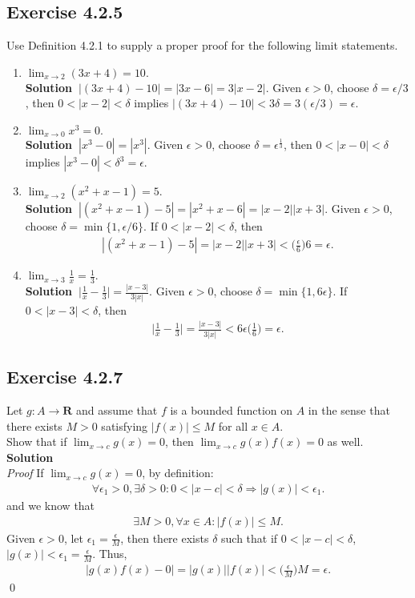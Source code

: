\documentclass[12pt]{report}
\newcommand{\sol}{{\textbf{Solution~}}}
\begin{document}
\subsection*{Exercise 4.2.5}
Use Definition 4.2.1 to supply a proper proof for the following
limit statements.
\begin{enumerate}[label=(\alph*)]
    \item $\lim_{x\to2}(3x+4)=10.$\\
    \sol $|(3x+4)-10|=|3x-6|=3|x-2|$. Given $\epsilon >0$, choose $\delta = \epsilon/3$, 
    then $0<|x-2|<\delta$ implies $|(3x+4)-10|<3\delta=3(\epsilon/3)=\epsilon$.
    \item $\lim_{x\to0}x^3=0.$\\
    \sol $|x^3-0|=|x^3|$. Given $\epsilon >0$, choose $\delta = \epsilon^{\frac{1}{3}}$, 
    then $0<|x-0|<\delta$ implies $|x^3-0|<\delta^3=\epsilon$.
    \item $\lim_{x\to2}(x^2+x-1)=5.$\\
    \sol $|(x^2+x-1)-5|=|x^2+x-6|=|x-2||x+3|$. Given $\epsilon >0$, choose $\delta = \min \{1,\epsilon/6\}$. 
    If $0<|x-2|<\delta$, then 
    \begin{align*}
        |(x^2+x-1)-5|=|x-2||x+3|<\bigg(\frac{\epsilon}{6}\bigg)6=\epsilon.
    \end{align*}
    \item $\lim_{x\to3}\frac{1}{x}=\frac{1}{3}.$\\
    \sol $\bigg|\frac{1}{x}-\frac{1}{3}\bigg|=\frac{|x-3|}{3|x|}$. Given $\epsilon >0$, 
    choose $\delta=\min\{1,6\epsilon\}$. If $0<|x-3|<\delta$, then
    \begin{align*}
        \bigg|\frac{1}{x}-\frac{1}{3}\bigg|=\frac{|x-3|}{3|x|}<6\epsilon\bigg(\frac{1}{6}\bigg)=\epsilon.
    \end{align*}
\end{enumerate}
\subsection*{Exercise 4.2.7}
Let $g : A \to \mathbf{R}$ and assume that $f$ is a bounded function on $A$
in the sense that there exists $M >0$ satisfying $|f(x)| \leq M$ for all $x \in A$.\\
Show that if $\lim_{x\to c} g(x) = 0$, then $\lim_{x\to c} g(x)f(x) = 0$ as well.\\
\sol \\\textit{Proof} If $\lim_{x\to c} g(x) = 0$, by definition:
\begin{align*}
    \forall \epsilon_1>0, \exists \delta>0 : 0<|x-c|<\delta \Rightarrow |g(x)|<\epsilon_1.
\end{align*}
and we know that
\begin{align*}
    \exists M>0, \forall x \in A: |f(x)|\leq M.
\end{align*}
Given $\epsilon >0$, let $\epsilon_1=\frac{\epsilon}{M}$, then there exists $\delta$ such that 
if $0<|x-c|<\delta$, $|g(x)|<\epsilon_1=\frac{\epsilon}{M}$. Thus,
\begin{align*}
    |g(x)f(x)-0|=|g(x)||f(x)|<\biggl(\frac{\epsilon}{M}\biggr)M=\epsilon.
\end{align*}
\qed
\end{document}
